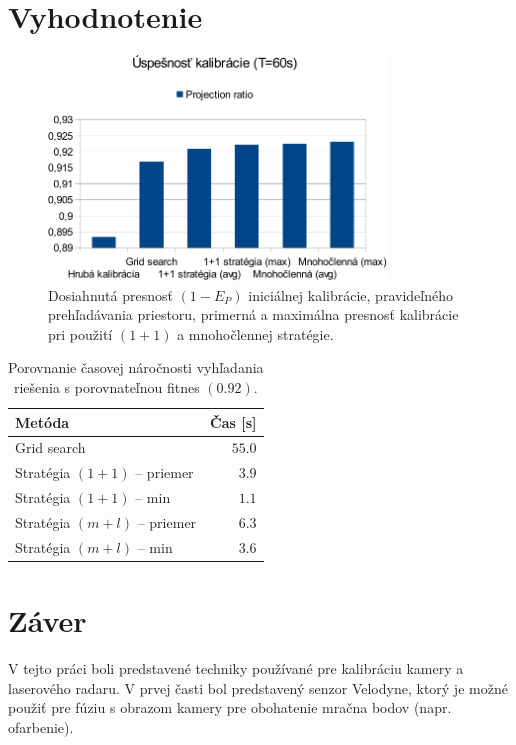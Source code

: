 \documentclass[12pt, a4paper]{article}
\begin{document}
\section{Vyhodnotenie}
\begin{figure}[h]
\center
	\includegraphics[width=0.8\textwidth]{fig/results.pdf}
\caption{Dosiahnutá presnosť $(1-E_P)$ iniciálnej kalibrácie, pravideľného prehľadávania priestoru, primerná a maximálna presnosť kalibrácie pri použití $(1+1)$ a mnohočlennej stratégie.\label{fig:results-accuracy}}
\end{figure}

\begin{table}
	\center
	\begin{tabular}{|l|r|}
		\hline
		\textbf{Metóda} & \textbf{Čas [s]}\\
		\hline\hline
		Grid search & $55.0$ \\\hline
		Stratégia $(1+1)$ -- priemer & $3.9$ \\\hline
		Stratégia $(1+1)$ -- min     & $1.1$ \\\hline
		Stratégia $(m+l)$ -- priemer & $6.3$ \\\hline
		Stratégia $(m+l)$ -- min     & $3.6$ \\\hline
	\end{tabular}
	\caption{Porovnanie časovej náročnosti vyhľadania riešenia s porovnateľnou fitnes $(0.92)$.\label{tab:results-time}}
\end{table}

\section{Záver}
V tejto práci boli predstavené techniky používané pre kalibráciu kamery a laserového radaru. V prvej časti bol predstavený senzor Velodyne, ktorý je možné použiť pre fúziu s obrazom kamery pre obohatenie mračna bodov (napr. ofarbenie).
\end{document}
